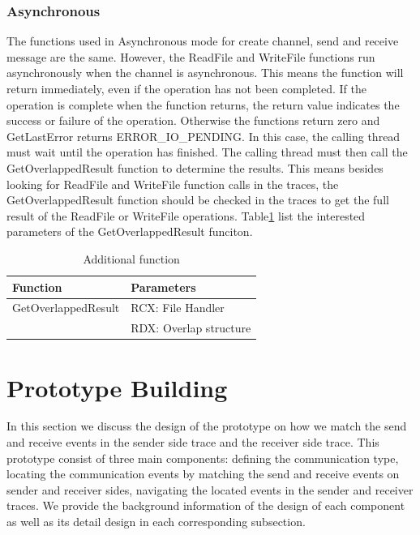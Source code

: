 \documentclass[paper=a4, fontsize=11pt]{scrartcl}
\numberwithin{equation}{section}		%
\numberwithin{figure}{section}			%
\numberwithin{table}{section}				%
\begin{document}
\subsubsection{Asynchronous}
The functions used in Asynchronous mode for create channel, send and receive message are the same. However,  the ReadFile and WriteFile functions run asynchronously when the channel is asynchronous. This means the function will return immediately, even if the operation has not been completed. If the operation is complete when the function returns, the return value indicates the success or failure of the operation. Otherwise the functions return zero and GetLastError returns ERROR\_IO\_PENDING. In this case, the calling thread must wait until the operation has finished. The calling thread must then call the GetOverlappedResult function to determine the results. This means besides looking for ReadFile and WriteFile function calls in the traces, the GetOverlappedResult function should be checked in the traces to get the full result of the ReadFile or WriteFile operations. Table\ref{asynfunctions} list the interested parameters of the GetOverlappedResult funciton.
\begin{table}[h]
        \centering
        \caption{Additional function}
        \label{asynfunctions}
        \begin{tabular}{|l|l|}
        \hline
             Function & Parameters \\
             \hline
             GetOverlappedResult& RCX: File Handler \\
             \cline{2-2} 
             &RDX: Overlap structure\\
            \hline
        \end{tabular}
    \end{table}



\section{Prototype Building}
In this section we discuss the design of the prototype on how we match the send and receive events in the sender side trace and the receiver side trace. This prototype consist of three main components: defining the communication type, locating the communication events by matching the send and receive events on sender and receiver sides, navigating the located events in the sender and receiver traces. We provide the background information of the design of each component as well as its detail design in each corresponding subsection.
\end{document}
